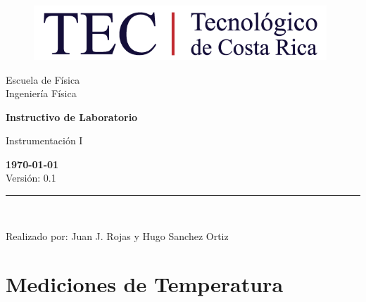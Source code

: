 \documentclass[12pt,letterpaper]{report}
\begin{document}
\begin{titlepage}
    \begin{center}
\vspace*{1in}
\begin{figure}[htb]
\begin{center}
\includegraphics[width=11cm]{fig/logo.png}
\end{center}
\end{figure}
\vspace*{0.4in}
\begin{Large}
Escuela de Física\\
\vspace*{0.15in}
Ingeniería Física\\
\vspace*{0.8in}
\end{Large}
\vspace*{0.2in}
\begin{Large}
\textbf{Instructivo de Laboratorio} \\
\end{Large}
\vspace*{0.3in}
\begin{large}
Instrumentación I\\
\end{large}
\vspace*{2.5in}
\begin{Large}
\textbf{\today}\\
Versión: 0.1\\
\end{Large}
\rule{80mm}{0.1mm}\\
\vspace*{0.1in}
\begin{large}
Realizado por: Juan J. Rojas y Hugo Sanchez Ortiz\\
\end{large}
\end{center}
\end{titlepage}
\tableofcontents


\chapter{Mediciones de Temperatura}
\end{document}
